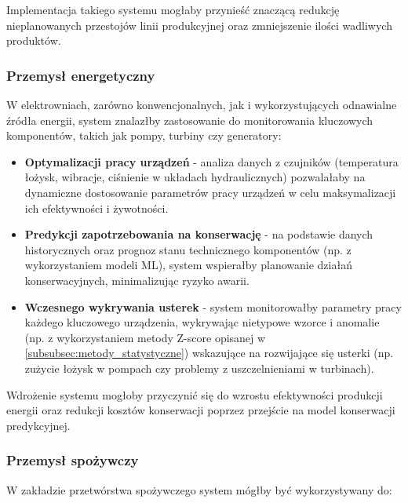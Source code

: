 Implementacja takiego systemu mogłaby przynieść znaczącą redukcję nieplanowanych przestojów linii produkcyjnej oraz zmniejszenie ilości wadliwych produktów.

\subsubsection{Przemysł energetyczny}
\label{subsubsec:przemysl_energetyczny}

W elektrowniach, zarówno konwencjonalnych, jak i wykorzystujących odnawialne źródła energii, system znalazłby zastosowanie do monitorowania kluczowych komponentów, takich jak pompy, turbiny czy generatory:

\begin{itemize}
    \item \textbf{Optymalizacji pracy urządzeń} - analiza danych z czujników (temperatura łożysk, wibracje, ciśnienie w układach hydraulicznych) pozwalałaby na dynamiczne dostosowanie
    parametrów pracy urządzeń w celu maksymalizacji ich efektywności i żywotności.
    \item \textbf{Predykcji zapotrzebowania na konserwację} - na podstawie danych historycznych oraz prognoz stanu technicznego komponentów (np. z wykorzystaniem modeli ML), system wspierałby
    planowanie działań konserwacyjnych, minimalizując ryzyko awarii.
    \item \textbf{Wczesnego wykrywania usterek} - system monitorowałby parametry pracy każdego kluczowego urządzenia, wykrywając nietypowe wzorce i anomalie (np. z wykorzystaniem metody Z-score opisanej w \ref{subsubsec:metody_statystyczne})
    wskazujące na rozwijające się usterki (np. zużycie łożysk w pompach czy problemy z uszczelnieniami w turbinach).
\end{itemize}

Wdrożenie systemu mogłoby przyczynić się do wzrostu efektywności produkcji energii oraz redukcji kosztów konserwacji poprzez przejście na model konserwacji predykcyjnej.

\subsubsection{Przemysł spożywczy}
\label{subsubsec:przemysl_spozywczy}

W zakładzie przetwórstwa spożywczego system mógłby być wykorzystywany do:

